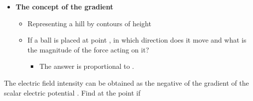 \begin{ELunit}

\begin{itemize}
\tightlist
\item
  \textbf{The concept of the gradient}

  \begin{itemize}
  \tightlist
  \item
    Representing a hill by contours of height \ELim{\ELto} 
  \item
    If a ball is placed at point , in which direction does it move and what is the magnitude of the force acting on it?

    \begin{itemize}
    \tightlist
    \item
      The answer is proportional to .
    \end{itemize}
  \end{itemize}
\end{itemize}


\end{ELunit}


\begin{ELexample}{}

The electric field intensity  can be obtained as the negative of the gradient of the scalar electric potential . Find  at the point  if

\begin{ELsolution}


\end{ELsolution}

\end{ELexample}

\ELhold


